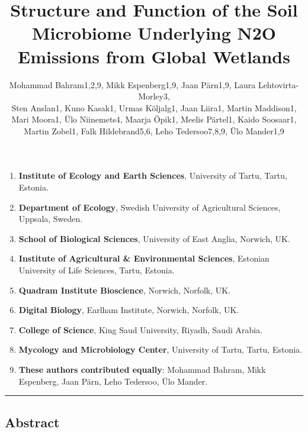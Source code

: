 \documentclass[
]{article}
\title{Structure and Function of the Soil Microbiome Underlying N2O
Emissions from Global Wetlands}
\author{Mohammad Bahram1,2,9, Mikk Espenberg1,9, Jaan Pärn1,9, Laura
Lehtovirta-Morley3,\\
Sten Anslan1, Kuno Kasak1, Urmas Kõljalg1, Jaan Liira1, Martin
Maddison1,\\
Mari Moora1, Ülo Niinemets4, Maarja Öpik1, Meelis Pärtel1, Kaido
Soosaar1,\\
Martin Zobel1, Falk Hildebrand5,6, Leho Tedersoo7,8,9, Ülo Mander1,9}
\date{}
\providecommand{\tightlist}{%
  \setlength{\itemsep}{0pt}\setlength{\parskip}{0pt}}
\begin{document}
\maketitle

{
\setcounter{tocdepth}{2}
\tableofcontents
}
\begin{enumerate}
\def\labelenumi{\arabic{enumi}.}
\tightlist
\item
  \textbf{Institute of Ecology and Earth Sciences}, University of Tartu,
  Tartu, Estonia.\\
\item
  \textbf{Department of Ecology}, Swedish University of Agricultural
  Sciences, Uppsala, Sweden.\\
\item
  \textbf{School of Biological Sciences}, University of East Anglia,
  Norwich, UK.\\
\item
  \textbf{Institute of Agricultural \& Environmental Sciences}, Estonian
  University of Life Sciences, Tartu, Estonia.\\
\item
  \textbf{Quadram Institute Bioscience}, Norwich, Norfolk, UK.\\
\item
  \textbf{Digital Biology}, Earlham Institute, Norwich, Norfolk, UK.\\
\item
  \textbf{College of Science}, King Saud University, Riyadh, Saudi
  Arabia.\\
\item
  \textbf{Mycology and Microbiology Center}, University of Tartu, Tartu,
  Estonia.\\
\item
  \textbf{These authors contributed equally}: Mohammad Bahram, Mikk
  Espenberg, Jaan Pärn, Leho Tedersoo, Ülo Mander.
\end{enumerate}

\begin{center}\rule{0.5\linewidth}{0.5pt}\end{center}

\hypertarget{abstract}{%
\subsection{Abstract}\label{abstract}}
\end{document}
